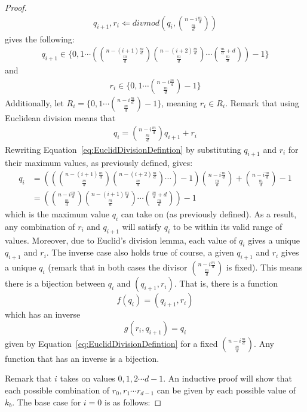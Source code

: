 \begin{proof}
\begin{align}
q_{i+1},r_i \Longleftarrow \mathit{divmod}\left(q_i,{n - i\frac{m}{d} \choose \frac{m}{d}}\right)
\end{align}
gives the following:
\begin{align}
q_{i+1} \in \{0, 1 \cdots \left({n - (i+1)\frac{m}{d} \choose \frac{m}{d}}{n - (i+2)\frac{m}{d} \choose \frac{m}{d}}\cdots{\frac{m}{d} + d \choose \frac{m}{d}}\right) - 1 \}
\end{align}
and
\begin{align}
r_i \in \{0, 1 \cdots {n - i\frac{m}{d} \choose \frac{m}{d}} - 1\}
\end{align}
Additionally, let $R_i = \{0, 1 \cdots {n - i\frac{m}{d} \choose \frac{m}{d}} - 1\}$, meaning $r_i \in R_i$. Remark that using Euclidean division means that
\begin{align}
q_{i} = {n - i\frac{m}{d} \choose \frac{m}{d}}q_{i+1} + r_{i} \label{eq:EuclidDivisionDefintion}
\end{align}
Rewriting Equation~\eqref{eq:EuclidDivisionDefintion} by substituting $q_{i+1}$ and $r_i$ for their maximum values, as previously defined, gives:
\begin{align}
q_{i} &= \left(\left({n - (i+1)\frac{m}{d} \choose \frac{m}{d}}{n - (i+2)\frac{m}{d} \choose \frac{m}{d}}\cdots \right) - 1\right) {n - i\frac{m}{d} \choose \frac{m}{d}} + {n - i\frac{m}{d} \choose \frac{m}{d}} - 1 \\
&= \left({n - i\frac{m}{d} \choose \frac{m}{d}}{n - (i+1)\frac{m}{d} \choose \frac{m}{d}}\cdots{\frac{m}{d} + d \choose \frac{m}{d}}\right) - 1
\end{align}
which is the maximum value $q_i$ can take on (as previously defined). As a result, any combination of $r_i$ and $q_{i+1}$ will satisfy $q_i$ to be within its valid range of values. Moreover, due to Euclid's division lemma, each value of $q_i$ gives a unique $q_{i+1}$ and $r_i$. The inverse case also holds true of course, a given $q_{i+1}$ and $r_i$ gives a unique $q_i$ (remark that in both cases the divisor ${n - i\frac{m}{d} \choose \frac{m}{d}}$ is fixed). This means there is a bijection between $q_{i}$ and $(q_{i+1}, r_i)$. That is, there is a function $$f(q_i) = (q_{i+1}, r_i)$$ which has an inverse $$g(r_i,q_{i+1}) = q_i$$ given by Equation~\eqref{eq:EuclidDivisionDefintion} for a fixed ${n - i\frac{m}{d} \choose \frac{m}{d}}$. Any function that has an inverse is a bijection.

Remark that $i$ takes on values $0, 1, 2 \cdots d - 1$. An inductive proof will show that each possible combination of $r_0,r_1 \cdots r_{d-1}$ can be given by each possible value of $k_b$. The base case for $i = 0$ is as follows:


\end{proof}
